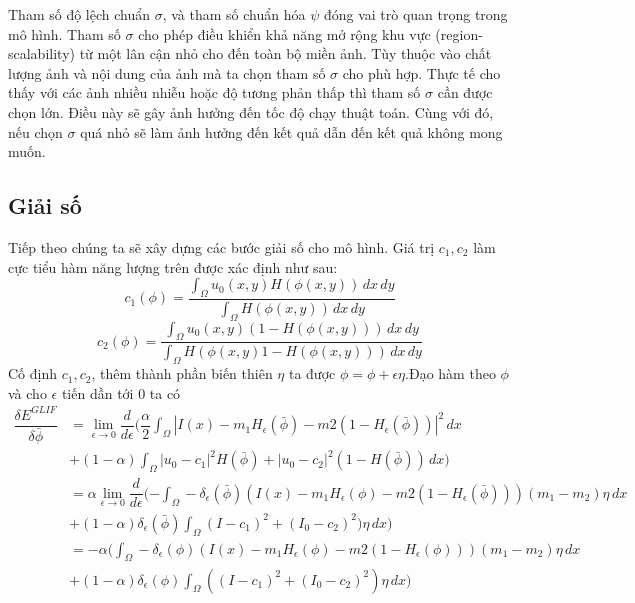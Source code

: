 \documentclass[12pt, oneside, a4]{book}
\begin{document}
Tham số độ lệch chuẩn $\sigma$, và tham số chuẩn hóa $\psi$ đóng vai trò quan trọng trong mô hình.  Tham số $\sigma$ cho phép điều khiển khả năng mở rộng khu vực (region-scalability) từ một lân cận nhỏ cho đến toàn bộ miền ảnh. Tùy thuộc vào chất lượng ảnh và nội dung của ảnh mà ta chọn tham số $\sigma$ cho phù hợp. Thực tế cho thấy với các ảnh nhiều nhiễu hoặc độ tương phản thấp thì tham số $\sigma$ cần được chọn lớn. Điều này sẽ gây  ảnh hưởng đến tốc độ chạy thuật toán. Cùng với đó, nếu chọn $\sigma$ quá nhỏ sẽ làm ảnh hưởng đến kết quả dẫn đến kết quả không mong muốn.
\subsection{Giải số}
Tiếp theo chúng ta sẽ xây dựng các bước giải số cho mô hình. Giá trị $c_1, c_2$ làm cực tiểu hàm năng lượng trên được xác định như sau:
\begin{equation}
c_1(\phi)=\dfrac{\int_{\Omega}u_0(x,y)H(\phi(x,y))\,dx \,dy}{\int_{\Omega}H(\phi(x,y))\,dx\,dy}
\end{equation}
\begin{equation}
c_2(\phi)=\dfrac{\int_{\Omega}u_0(x,y)(1-H(\phi(x,y)))\,dx \,dy}{\int_{\Omega}H(\phi(x,y)1-H(\phi(x,y)))\,dx\,dy}
\end{equation}
Cố định $c_1, c_2$, thêm thành phần biến thiên $\eta$ ta được $\phi=\phi+\epsilon\eta$.Đạo hàm theo $\phi$ và cho $\epsilon$ tiến dần tới 0 ta có
\begin{equation*}
\begin{split}
\dfrac{\delta E^{GLIF}}{\delta\bar{\phi} } &=\lim_{\epsilon \rightarrow 0}\dfrac{d}{d \epsilon}(\dfrac{\alpha}{2}\int_{\Omega}|I(x)-m_1H_{\epsilon}(\bar{\phi})-m2(1-H_{\epsilon}(\bar{\phi}))|^2\,dx \\ 
&+(1-\alpha) \int_{\Omega} |u_0-c_1|^2H(\bar{\phi})+ |u_0-c_2|^2(1-H(\bar{\phi})) \,dx)\\
&=\alpha\lim_{\epsilon \rightarrow 0}\dfrac{d}{d \epsilon}(-\int_{\Omega}-\delta_{\epsilon}(\bar{\phi})(I(x)-m_1H_{\epsilon}(\phi)-m2(1-H_{\epsilon}(\bar{\phi})))(m_1-m_2)\eta\,dx \\ 
&+(1-\alpha)\delta_{\epsilon}(\bar{\phi})\int_{\Omega} (I-c_1)^2+ (I_0-c_2)^2)\eta \,dx)\\
&=-\alpha(\int_{\Omega}-\delta_{\epsilon}(\phi)(I(x)-m_1 H_{\epsilon}(\phi)-m2(1-H_{\epsilon}(\phi)))(m_1-m_2)\eta\,dx\\
&+(1-\alpha)\delta_{\epsilon}(\phi)\int_{\Omega} ((I-c_1)^2+ (I_0-c_2)^2)\eta \,dx)
\end{split}
\end{equation*}
\end{document}
